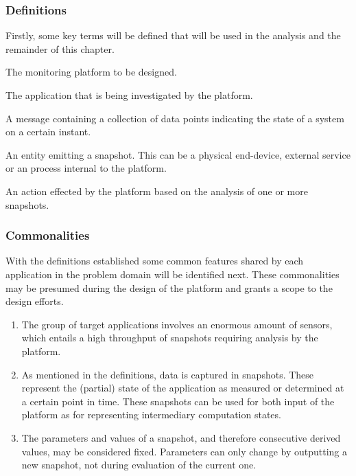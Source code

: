 \subsubsection*{Definitions}
Firstly, some key terms will be defined that will be used in the analysis and the remainder of this chapter.
\begin{description}[style=nextline]
\nospace
\item[Platform] The monitoring platform to be designed.
\item[Application] The application that is being investigated by the platform.
\item[Snapshot] A message containing a collection of data points indicating the state of a system on a certain instant.
\item[Source] An entity emitting a snapshot. This can be a physical end-device, external service or an process internal to the platform.
\item[Consequence] An action effected by the platform based on the analysis of one or more snapshots.
\end{description}
\subsubsection*{Commonalities}
With the definitions established some common features shared by each application in the problem domain will be identified next. These commonalities may be presumed during the design of the platform and grants a scope to the design efforts.
\begin{enumerate}[label=C\archid .\arabic*]
\nospace
\item \label{c:scale_sensor} The group of target applications involves an enormous amount of sensors, which entails a high throughput of snapshots requiring analysis by the platform.
\item \label{c:snapshot} As mentioned in the definitions, data is captured in snapshots. These represent the (partial) state of the application as measured or determined at a certain point in time. These snapshots can be used for both input of the platform as for representing intermediary computation states.
\item \label{c:snapshot_transformation} The parameters and values of a snapshot, and therefore consecutive derived values, may be considered fixed. Parameters can only change by outputting a new snapshot, not during evaluation of the current one.
\end{enumerate}
